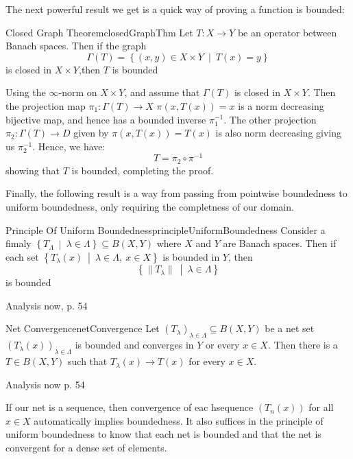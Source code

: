 \documentclass[oneside]{book}
\newcommand{\sse}{\subseteq}
\newcommand{\set}[2]{\left\{#1 \ \middle|\ #2\right\}}
\begin{document}
The next powerful result we get is a quick way of proving a function is bounded:

\begin{thm}{Closed Graph Theorem}{closedGraphThm}
	Let $T: X \to Y$ be an operator between Banach spaces. Then if the graph
	\[
		\Gamma(T) = \set{(x,y) \in X\times Y}{T(x) = y}
	\]
	is closed in $X\times Y$,then $T$ is bounded
\end{thm}

\begin{Proof}
	Using the $\infty$-norm on $X\times Y$, and assume that $\Gamma(T)$ is closed in $X\times Y$. Then the
	projection map $\pi_1: \Gamma(T) \to X$ $\pi(x, T(x)) = x$ is a norm decreasing bijective map, and hence has
	a bounded inverse $\pi_1^{-1}$. The other projection $\pi_2: \Gamma(T) \to D$ given by $\pi(x,T(x)) = T(x)$ is
	also norm decreasing giving us $\pi_2^{-1}$. Hence, we have:
	\[
		T = \pi_2\circ\pi^{-1}
	\]
	showing that $T$ is bounded, completing the proof.
\end{Proof}

Finally, the following result is a way from passing from pointwise boundedness to uniform boundedness, only
requiring the completness of our domain.

\begin{thm}{Principle Of Uniform Boundedness}{principleUniformBoundedness}
	Consider a fimaly $\set{T_\Lambda}{\lambda \in \Lambda} \sse B(X, Y)$ where $X$ and $Y$ are Banach spaces. Then
	if each set $\set{T_\lambda(x)}{\lambda \in \Lambda,\ x \in X}$ is bounded in $Y$, then
	\[
		\set{\|T_\lambda\|}{\lambda \in \Lambda}
	\]
	is bounded
\end{thm}

\begin{Proof}
	Analysis now, p. 54
\end{Proof}

\begin{cor}{Net Convergence}{netConvergence}
	Let $(T_\lambda)_{\lambda \in \Lambda} \sse B(X, Y)$ be a net set $(T_\lambda(x))_{\lambda \in \Lambda}$ is
	bounded and converges in $Y$ or every $x \in X$. Then there is a $T \in B(X,Y)$ such that $T_\lambda(x) \to
	T(x)$ for every $x \in X$.
\end{cor}

\begin{Proof}
	Analysis now p. 54
\end{Proof}

If our net is a sequence, then convergence of eac hsequence $(T_n(x))$ for all $x \in X$ automatically implies
boundedness. It also suffices in the principle of uniform boundedness to know that each net is bounded and that
the net is convergent for a dense set of elements.
\end{document}
